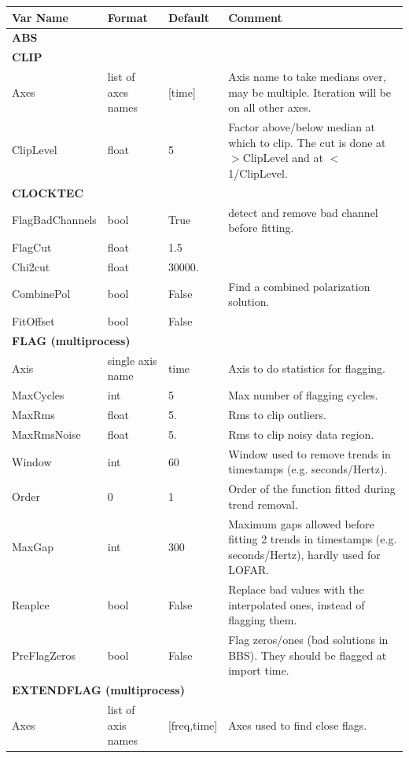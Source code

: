\documentclass[]{article}
\begin{document}
\begin{longtable}{l p{3cm} l p{8cm}}
\hline
\hline
Var Name & Format & Default & Comment\\
\hline
\multicolumn{4}{l}{\textbf{ABS}}\\
\hline
\multicolumn{4}{l}{\textbf{CLIP}}\\
Axes & list of axes names & [time] & Axis name to take medians over, may be multiple. Iteration will be on all other axes.\\
ClipLevel & float & 5 & Factor above/below median at which to clip. The cut is done at $>$ClipLevel and at $<$1/ClipLevel.\\
\hline
\multicolumn{4}{l}{\textbf{CLOCKTEC}}\\
FlagBadChannels & bool & True & detect and remove bad channel before fitting.\\
FlagCut & float & 1.5 & \\
Chi2cut & float & 30000. & \\
CombinePol & bool & False & Find a combined polarization solution.\\
FitOffset & bool & False & \\
\hline
\multicolumn{4}{l}{\textbf{FLAG (multiprocess)}}\\
Axis & single axis name & time & Axis to do statistics for flagging.\\
MaxCycles & int & 5 & Max number of flagging cycles.\\
MaxRms & float & 5. & Rms to clip outliers.\\
MaxRmsNoise & float & 5. & Rms to clip noisy data region.\\
Window & int & 60 & Window used to remove trends in timestamps (e.g. seconds/Hertz).\\
Order & 0\textbar1\textbar2 & 1 & Order of the function fitted during trend removal.\\
MaxGap & int & 300 & Maximum gaps allowed before fitting 2 trends in timestamps (e.g. seconds/Hertz), hardly used for LOFAR.\\
Reaplce & bool & False & Replace bad values with the interpolated ones, instead of flagging them.\\
PreFlagZeros & bool & False & Flag zeros/ones (bad solutions in BBS). They should be flagged at import time.\\
\hline
\multicolumn{4}{l}{\textbf{EXTENDFLAG (multiprocess)}}\\
Axes & list of axis names & [freq,time] & Axes used to find close flags.\\

\end{longtable}
\end{document}
